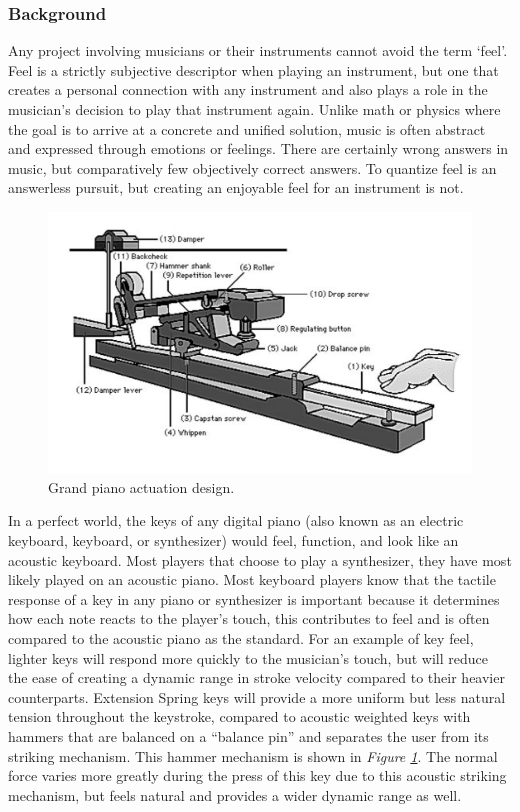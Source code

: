 \subsubsection{Background}

Any project involving musicians or their instruments cannot avoid the term ‘feel’. Feel is a strictly subjective descriptor when playing an instrument, but one that creates a personal connection with any instrument and also plays a role in the musician’s decision to play that instrument again. Unlike math or physics where the goal is to arrive at a concrete and unified solution, music is often abstract and expressed through emotions or feelings. There are certainly wrong answers in music, but comparatively few objectively correct answers. To quantize feel is an answerless pursuit, but creating an enjoyable feel for an instrument is not.

\begin{figure}[h!]
  \centering
  \includegraphics[width=\linewidth]{image/KeyMechanism.png}
  \caption{Grand piano actuation design.}
  \label{fig:key_mechanism}
\end{figure}

In a perfect world, the keys of any digital piano (also known as an electric keyboard, keyboard, or synthesizer) would feel, function, and look like an acoustic keyboard. Most players that choose to play a synthesizer, they have most likely played on an acoustic piano. Most keyboard players know that the tactile response of a key in any piano or synthesizer is important because it determines how each note reacts to the player’s touch, this contributes to feel and is often compared to the acoustic piano as the standard. For an example of key feel, lighter keys will respond more quickly to the musician's touch, but will reduce the ease of creating a dynamic range in stroke velocity compared to their heavier counterparts. Extension Spring keys will provide a more uniform but less natural tension throughout the keystroke, compared to acoustic weighted keys with hammers that are balanced on a “balance pin” and separates the user from its striking mechanism. This hammer mechanism is shown in \textit{Figure \ref{fig:key_mechanism}}. The normal force varies more greatly during the press of this key due to this acoustic striking mechanism, but feels natural and provides a wider dynamic range as well.

